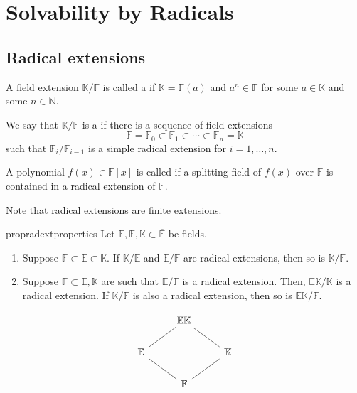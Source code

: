 \chapter{Solvability by Radicals}

\section{Radical extensions}

\begin{defn}%
	A field extension $\mathbb{K}/\mathbb{F}$ is called a  if $\mathbb{K} = \mathbb{F}(a)$ and $a^n \in \mathbb{F}$ for some $a \in \mathbb{K}$ and some $n \in \mathbb{N}.$

	We say that $\mathbb{K}/\mathbb{F}$ is a  if there is a sequence of field extensions
	\begin{equation*} 
		\mathbb{F} = \mathbb{F}_0 \subset \mathbb{F}_1 \subset \cdots \subset \mathbb{F}_n = \mathbb{K}
	\end{equation*}
	such that $\mathbb{F}_i/\mathbb{F}_{i - 1}$ is a simple radical extension for $i = 1, \ldots, n.$

	A polynomial $f(x) \in \mathbb{F}[x]$ is called  if a splitting field of $f(x)$ over $\mathbb{F}$ is contained in a radical extension of $\mathbb{F}.$
\end{defn}

\begin{rem}
	Note that radical extensions are finite extensions.
\end{rem}

\begin{restatable}[]{prop}{radextproperties}
\label{prop:radextproperties}
	Let $\mathbb{F}, \mathbb{E}, \mathbb{K} \subset \overline{\mathbb{F}}$ be fields. 
	\begin{enumerate}
		\item Suppose $\mathbb{F} \subset \mathbb{E} \subset \mathbb{K}.$ If $\mathbb{K}/\mathbb{E}$ and $\mathbb{E}/\mathbb{F}$ are radical extensions, then so is $\mathbb{K}/\mathbb{F}.$ 
		\item Suppose $\mathbb{F} \subset \mathbb{E}, \mathbb{K}$ are such that $\mathbb{E}/\mathbb{F}$ is a radical extension. Then, $\mathbb{E}\mathbb{K}/\mathbb{K}$ is a radical extension. If $\mathbb{K}/\mathbb{F}$ is also a radical extension, then so is $\mathbb{E}\mathbb{K}/\mathbb{F}.$ 
	\end{enumerate}
	\begin{equation*} 
		\begin{tikzcd}[ampersand replacement=\&]
			\& \mathbb{E}\mathbb{K}                               \&                                \\
			\mathbb{E} \arrow[ru, no head] \&                                                    \& \mathbb{K} \arrow[lu, no head] \\
			\& \mathbb{F} \arrow[ru, no head] \arrow[lu, no head] \& 
		\end{tikzcd}
	\end{equation*}
	\hfill\hyperref[prop:radextproperties2]{\downsym}
\end{restatable}

